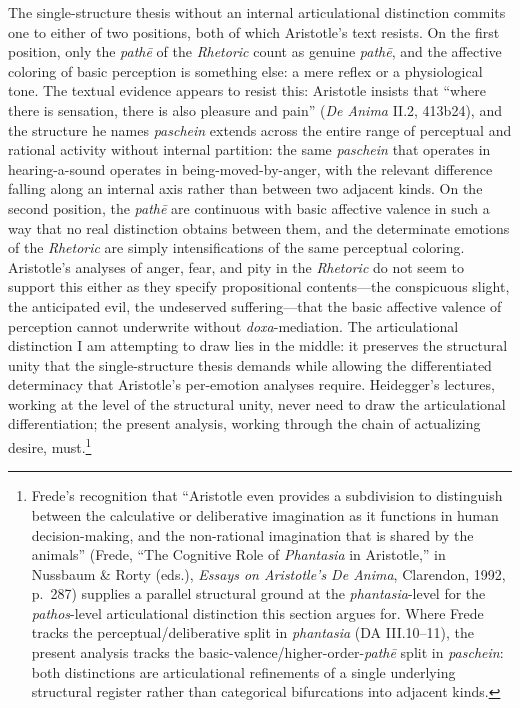 \documentclass{article}
\begin{document}
The single-structure thesis without an internal articulational distinction commits one to either of two positions, both of which Aristotle's text resists. On the first position, only the \textit{pathē} of the \textit{Rhetoric} count as genuine \textit{pathē}, and the affective coloring of basic perception is something else: a mere reflex or a physiological tone. The textual evidence appears to resist this: Aristotle insists that ``where there is sensation, there is also pleasure and pain'' (\textit{De Anima} II.2, 413b24), and the structure he names \textit{paschein} extends across the entire range of perceptual and rational activity without internal partition: the same \textit{paschein} that operates in hearing-a-sound operates in being-moved-by-anger, with the relevant difference falling along an internal axis rather than between two adjacent kinds. On the second position, the \textit{pathē} are continuous with basic affective valence in such a way that no real distinction obtains between them, and the determinate emotions of the \textit{Rhetoric} are simply intensifications of the same perceptual coloring. Aristotle's analyses of anger, fear, and pity in the \textit{Rhetoric} do not seem to support this either as they specify propositional contents---the conspicuous slight, the anticipated evil, the undeserved suffering---that the basic affective valence of perception cannot underwrite without \textit{doxa}-mediation. The articulational distinction I am attempting to draw lies in the middle: it preserves the structural unity that the single-structure thesis demands while allowing the differentiated determinacy that Aristotle's per-emotion analyses require. Heidegger's lectures, working at the level of the structural unity, never need to draw the articulational differentiation; the present analysis, working through the chain of actualizing desire, must.\footnote{Frede's recognition that ``Aristotle even provides a subdivision to distinguish between the calculative or deliberative imagination as it functions in human decision-making, and the non-rational imagination that is shared by the animals'' (Frede, ``The Cognitive Role of \textit{Phantasia} in Aristotle,'' in Nussbaum \& Rorty (eds.), \textit{Essays on Aristotle's De Anima}, Clarendon, 1992, p.~287) supplies a parallel structural ground at the \textit{phantasia}-level for the \textit{pathos}-level articulational distinction this section argues for. Where Frede tracks the perceptual/deliberative split in \textit{phantasia} (DA III.10--11), the present analysis tracks the basic-valence/higher-order-\textit{pathē} split in \textit{paschein}: both distinctions are articulational refinements of a single underlying structural register rather than categorical bifurcations into adjacent kinds.}
\end{document}
